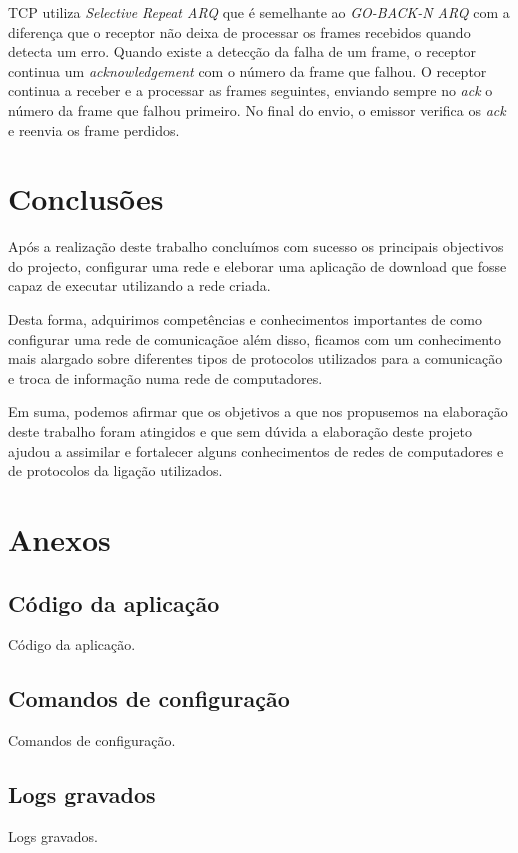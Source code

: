 \documentclass[a4paper]{article}
\begin{document}
	TCP utiliza \textit{Selective Repeat ARQ} que é semelhante ao \textit{GO-BACK-N ARQ} com a diferença que o receptor não deixa de processar os frames recebidos quando detecta um erro. Quando existe a detecção da falha de um frame, o receptor continua um \textit{acknowledgement} com o número da frame que falhou. O receptor continua a receber e a processar as frames seguintes, enviando sempre no \textit{ack} o número da frame que falhou primeiro. No final do envio, o emissor verifica os \textit{ack} e reenvia os frame perdidos.

\section{Conclusões}
Após a realização deste trabalho concluímos com sucesso os principais objectivos do projecto, configurar uma rede e eleborar uma aplicação de download que fosse capaz de executar utilizando a rede criada. 

Desta forma, adquirimos competências e conhecimentos importantes de como configurar uma rede de comunicaçãoe além disso, ficamos com um conhecimento mais alargado sobre diferentes tipos de protocolos utilizados para a comunicação e troca de informação numa rede de computadores.
 
Em suma, podemos afirmar que os objetivos a que nos propusemos na elaboração deste trabalho foram atingidos e que sem dúvida a elaboração deste projeto ajudou a assimilar e fortalecer alguns conhecimentos de redes de computadores e de protocolos da ligação utilizados.

\clearpage
{}
\renewcommand\refname{Referências}




\newpage
\appendix
\section{Anexos}

\subsection{Código da aplicação}
Código da aplicação.

\subsection{Comandos de configuração}
Comandos de configuração.

\subsection{Logs gravados}
Logs gravados.
\end{document}
